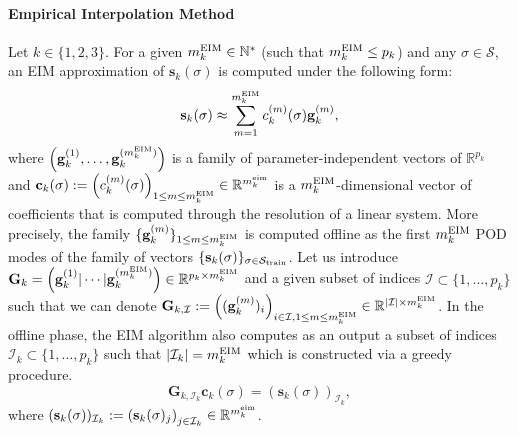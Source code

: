 \paragraph{Empirical Interpolation Method}
Let $k\in \{1, 2, 3\}$. For a given $m_k^{\rm EIM}\in \mathbb{N}^*$ (such that $m_k^{\rm EIM} \leq p_k$) and any $\sigma \in \mathcal S$, an EIM approximation of $\mathbf{s}_k(\sigma)$ is computed under the following form: 
\begin{equation}
\mathbf{s}_k(\sigma) \approx \sum_{m=1}^{m_k^{\rm EIM}} c_k^{(m)}(\sigma) \mathbf{g}_k^{(m)},
\label{eq:EIM}
\end{equation}
where $\left(\mathbf{g}_k^{(1)}, \ldots, \mathbf{g}_k^{(m_k^{\rm EIM})}\right)$ is a family of parameter-independent vectors of $\mathbb{R}^{p_k}$ and $\mathbf{c}_k(\sigma) := \left(c_k^{(m)}(\sigma)\right)_{1\leq m \leq m_k^{\rm EIM}} \in \mathbb{R}^{m_k^{\rm eim}}$ is a $m_k^{\rm EIM}$-dimensional vector of coefficients that is computed through the resolution of a linear system.  More precisely, the family $\{\mathbf{g}_k^{(m)}\}_{1\leq m \leq m_k^{\rm EIM}}$ is computed offline as the first $m_k^{\rm EIM}$ POD modes of the family of vectors $\{\mathbf{s}_k(\sigma)\}_{\sigma \in \mathcal S_{\rm train}}$. Let us introduce $\mathbf{G}_k = \left( \mathbf{g}_k^{(1)}|  \cdots | \mathbf{g}_k^{(m_k^{\rm EIM})} \right) \in \mathbb{R}^{p_k \times m_k^{\rm EIM}}$ and a given subset of indices $\mathcal I \subset \{1, \ldots, p_k\}$ such that we can denote $\mathbf{G}_{k, {\mathcal I}}:= \left( (\mathbf{g}_k^{(m)})_i\right)_{i\in \mathcal I, 1\leq m \leq m_k^{\rm EIM}} \in \mathbb{R}^{|\mathcal I| \times m_k^{\rm EIM}}$. 
In the offline phase, the EIM algorithm also computes as an output a subset of indices $\mathcal{I}_k \subset \{1, \ldots, p_k\}$ such that $|\mathcal{I}_k| = m_k^{\rm EIM}$ which is constructed via a greedy procedure. 
$$
\mathbf{G}_{k, \mathcal{I}_k} \mathbf{c}_k(\sigma) = (\mathbf{s}_k(\sigma))_{\mathcal{I}_k},
$$ 
where $(\mathbf{s}_k(\sigma))_{\mathcal{I}_k}:= \left( \mathbf{s}_k(\sigma)_{j}\right)_{j \in \mathcal{I}_k}\in \mathbb{R}^{m_k^{\rm eim}}$. 
